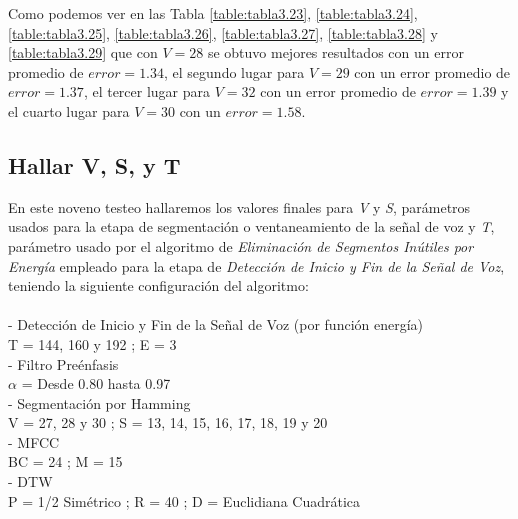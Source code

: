 \vskip -0.5cm
Como podemos ver en las Tabla \ref{table:tabla3.23}, \ref{table:tabla3.24}, \ref{table:tabla3.25}, \ref{table:tabla3.26}, \ref{table:tabla3.27}, \ref{table:tabla3.28} y \ref{table:tabla3.29} que con $V = 28$ se obtuvo mejores resultados con un error promedio de $error = 1.34$, el segundo lugar para $V = 29$ con un error promedio de $error = 1.37$, el tercer lugar para $V = 32$ con un error promedio de $error = 1.39$ y el cuarto lugar para $V = 30$ con un $error = 1.58$.

\subsection{Hallar V, S, y T}
En este noveno testeo hallaremos los valores finales para \textit{V} y \textit{S}, parámetros usados para la etapa de segmentación o ventaneamiento de la señal de voz y \textit{T}, parámetro usado por el algoritmo de \textit{Eliminación de Segmentos Inútiles por Energía} empleado para la etapa de \textit{Detección de Inicio y Fin de la Señal de Voz}, teniendo la siguiente configuración del algoritmo: \\ \\
- Detección de Inicio y Fin de la Señal de Voz (por función energía) \\
\hspace*{1cm} T = 144, 160 y 192 ; \qquad E = 3 \\
- Filtro Preénfasis \\
\hspace*{1cm} $\alpha$ = Desde 0.80 hasta 0.97 \\
- Segmentación por Hamming \\
\hspace*{1cm} V = 27, 28 y 30 ; \qquad S = 13, 14, 15, 16, 17, 18, 19 y 20 \\
- MFCC \\
\hspace*{1cm} BC = 24 ; \qquad M = 15 \\
- DTW \\
\hspace*{1cm} P = 1/2 Simétrico ; \qquad R = 40 ; \qquad D = Euclidiana Cuadrática

